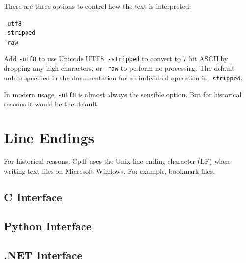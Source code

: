 \documentclass{book}
\begin{document}
\noindent There are three options to control how the text is interpreted:

\begin{framed}
  \noindent\small\verb!-utf8!\\
  \noindent\small\verb!-stripped!\\
  \noindent\small\verb!-raw!
\end{framed}

\noindent Add \verb!-utf8! to use Unicode UTF8, \verb!-stripped! to convert to 7
bit ASCII by dropping any high characters, or \verb!-raw! to perform no
processing. The default unless specified in the documentation for an individual operation is \verb!-stripped!.

In modern usage, \texttt{-utf8} is almost always the sensible option. But for historical reasons it would be the default.

\section{Line Endings}

For historical reasons, Cpdf uses the Unix line ending character (LF) when writing text files on Microsoft Windows. For example, bookmark files.

\begin{cpdflib}
\clearpage
\section*{C Interface}
\begin{small}\tt


\end{small}
\end{cpdflib}

\begin{pycpdflib}
\clearpage
\section*{Python Interface}
\begin{small}\tt


\end{small}
\end{pycpdflib}

\begin{dotnetcpdflib}
\clearpage
\section*{.NET Interface}
\begin{small}\tt



\end{small}
\end{dotnetcpdflib}
\end{document}
